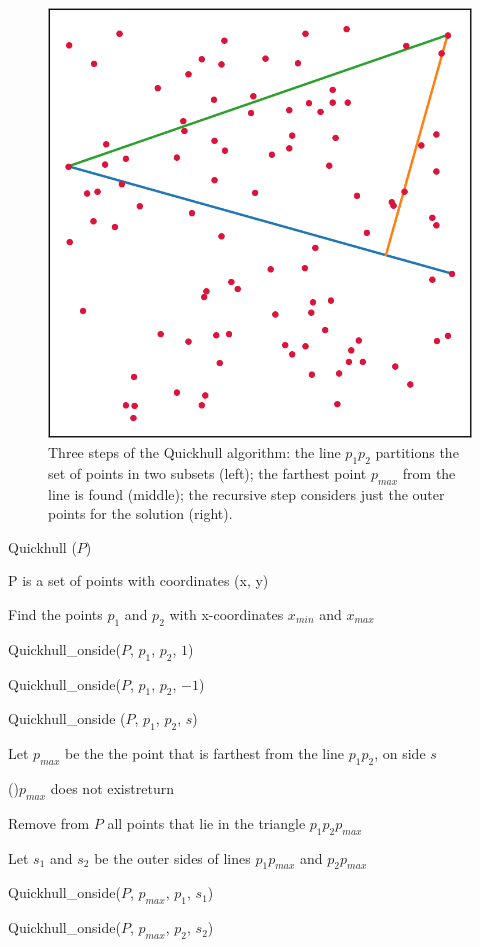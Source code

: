 \documentclass[]{finalproject}
\begin{document}
\begin{figure}[H]
\begin{minipage}{.25\linewidth}
	\end{minipage}
    \begin{minipage}{.25\linewidth}
		\includegraphics[width=\linewidth]{quickhull3.png}
	\end{minipage}
    \caption{Three steps of the Quickhull algorithm: the line $p_1p_2$ partitions the set of points in two subsets (left); the farthest point $p_{max}$ from the line is found (middle); the recursive step considers just the outer points for the solution (right).}
    \label{fig:qh-steps}
\end{figure}

\begin{algorithm}
    \caption{Quickhull ($P$)}
    \label{alg:qh1}
    P is a set of points with coordinates (x, y)

    Find the points $p_1$ and $p_2$ with x-coordinates $x_{min}$ and $x_{max}$

    Quickhull\_onside($P$, $p_1$, $p_2$, $1$)

    Quickhull\_onside($P$, $p_1$, $p_2$, $-1$)
\end{algorithm}
\begin{algorithm}
  \caption{Quickhull\_onside ($P$, $p_1$, $p_2$, $s$)}
  \label{alg:qh2}
  Let $p_{max}$ be the the point that is farthest from the line $p_1p_2$, on side $s$

  \If(){$p_{max}$ does not exist}{return}

  Remove from $P$ all points that lie in the triangle $p_1p_2p_{max}$

  Let $s_1$ and $s_2$ be the outer sides of lines $p_1p_{max}$ and $p_2p_{max}$

  Quickhull\_onside($P$, $p_{max}$, $p_1$, $s_1$)

  Quickhull\_onside($P$, $p_{max}$, $p_2$, $s_2$)
\end{algorithm}
\end{document}
